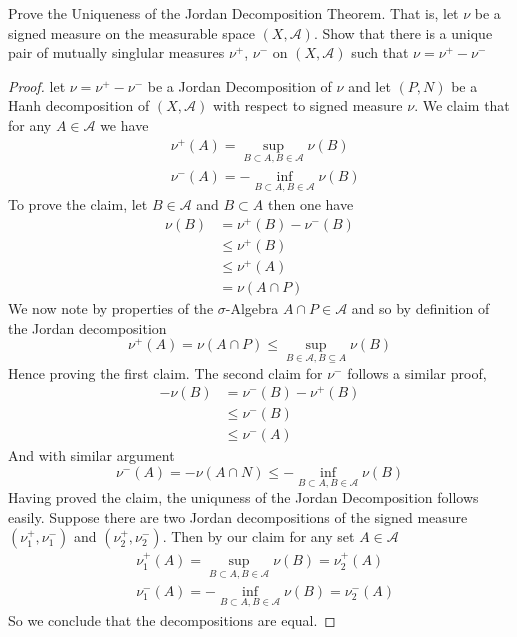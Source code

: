 \documentclass[nocolor]{report}
\begin{document}
\begin{ex}[Question 4] Prove the Uniqueness of the Jordan Decomposition Theorem. That is, let $\nu$ be a signed measure on the measurable space $(X,\mathcal{A})$. Show that there is a unique pair of mutually singlular measures $\nu^+$, $\nu^-$ on $(X,\mathcal{A})$ such that $\nu = \nu^+ - \nu^-$
\end{ex}
\begin{proof}
    let $\nu = \nu^+ - \nu^-$ be a Jordan Decomposition of $\nu$ and let $(P, N)$ be a Hanh decomposition of $(X,\mathcal{A})$ with respect to signed measure $\nu$. We claim that for any $A\in\mathcal{A}$ we have 
    \begin{align*}
        & \nu^+(A) = \sup_{B\subset A, B\in \mathcal{A}} \nu(B) \\
        &\nu^-(A) =  -\inf_{B\subset A, B\in \mathcal{A}} \nu(B)
    \end{align*}
    To prove the claim, let $B\in\mathcal{A}$ and $B\subset A$ then one have
    \begin{align*}
        \nu(B) &= \nu^+(B) - \nu^-(B) \\
        &\leq \nu^+(B) \\
        &\leq \nu^+(A) \\
        &= \nu(A\cap P) 
    \end{align*}
    We now note by properties of the $\sigma$-Algebra $A\cap P\in\mathcal{A}$ and so by definition of the Jordan decomposition
    $$\nu^+(A) = \nu(A\cap P)\leq \sup_{B\in\mathcal{A}, B\subseteq A}\nu (B)$$
    Hence proving the first claim. The second claim for $\nu^-$ follows a similar proof, 
    \begin{align*}
        -\nu(B) &= \nu^-(B) - \nu^+(B) \\
                &\leq \nu^-(B) \\
                &\leq \nu^-(A)
    \end{align*}
    And with similar argument 
    $$\nu^-(A) = -\nu(A\cap N) \leq - \inf_{B\subset A, B\in \mathcal{A}} \nu(B)$$
    Having proved the claim, the uniquness of the Jordan Decomposition follows easily. Suppose there are two Jordan decompositions of the signed measure $(\nu^+_1, \nu^-_1)$ and $(\nu^+_2, \nu^-_2)$. Then by our claim for any set $A\in \mathcal{A}$
    \begin{align*}
       & \nu_1^+(A) =  \sup_{B\subset A, B\in \mathcal{A}} \nu(B) = \nu_2^+(A) \\
       & \nu_1^-(A) =  -\inf_{B\subset A, B\in \mathcal{A}} \nu(B) = \nu_2^-(A)
    \end{align*}
    So we conclude that the decompositions are equal.
\end{proof}
\end{document}
